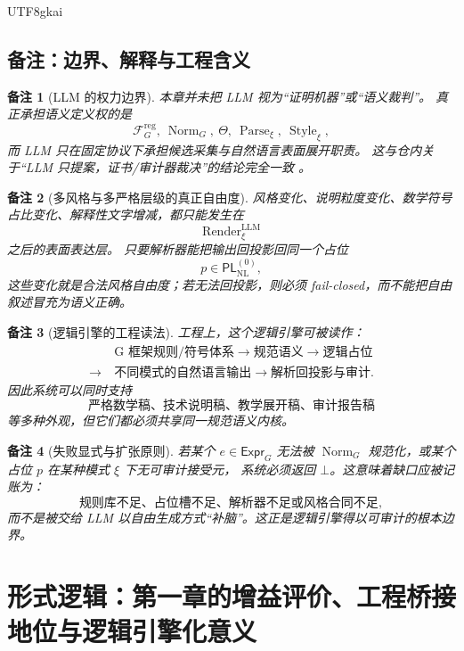 \documentclass[12pt]{article}
\newtheorem{remark}{备注}[section]
\newcommand{\Norm}{\operatorname{Norm}}
\newcommand{\Parse}{\operatorname{Parse}}
\newcommand{\Render}{\operatorname{Render}}
\newcommand{\Style}{\operatorname{Style}}
\begin{document}
\begin{CJK*}{UTF8}{gkai}
\subsection{备注：边界、解释与工程含义}
\label{subsec:tex37-remarks}

\begin{remark}[LLM 的权力边界]
本章并未把 LLM 视为“证明机器”或“语义裁判”。
真正承担语义定义权的是
\[
  \mathcal{F}^{\mathrm{reg}}_G,\ \Norm_G,\ \Theta,\ \Parse_\xi,\ \Style_\xi,
\]
而 LLM 只在固定协议下承担候选采集与自然语言表面展开职责。
这与仓内关于“LLM 只提案，证书/审计器裁决”的结论完全一致 \cite{RepoTex21AuditedWrapper,RepoTex23SemanticBase,GaoZhengAppVol2}。
\end{remark}

\begin{remark}[多风格与多严格层级的真正自由度]
风格变化、说明粒度变化、数学符号占比变化、解释性文字增减，都只能发生在
\[
  \Render^{\mathrm{LLM}}_\xi
\]
之后的表面表达层。
只要解析器能把输出回投影回同一个占位
\[
  p\in\mathsf{PL}_{\mathrm{NL}}^{(0)},
\]
这些变化就是合法风格自由度；若无法回投影，则必须 fail-closed，而不能把自由叙述冒充为语义正确。
\end{remark}

\begin{remark}[逻辑引擎的工程读法]
工程上，这个逻辑引擎可被读作：
\[
  \begin{aligned}
    &\text{G 框架规则/符号体系}
    \to
    \text{规范语义}
    \to
    \text{逻辑占位}\\
    \to\ &
    \text{不同模式的自然语言输出}
    \to
    \text{解析回投影与审计}.
  \end{aligned}
\]
因此系统可以同时支持
\[
  \text{严格数学稿、技术说明稿、教学展开稿、审计报告稿}
\]
等多种外观，但它们都必须共享同一规范语义内核。
\end{remark}

\begin{remark}[失败显式与扩张原则]
若某个 $e\in\mathsf{Expr}_G$ 无法被 $\Norm_G$ 规范化，或某个占位 $p$ 在某种模式 $\xi$ 下无可审计接受元，
系统必须返回 $\bot$。这意味着缺口应被记账为：
\[
  \text{规则库不足、占位槽不足、解析器不足或风格合同不足},
\]
而不是被交给 LLM 以自由生成方式“补脑”。这正是逻辑引擎得以可审计的根本边界。
\end{remark}

\clearpage

\section{形式逻辑：第一章的增益评价、工程桥接地位与逻辑引擎化意义}
\label{sec:tex37-ch2}


\end{CJK*}
\end{document}
